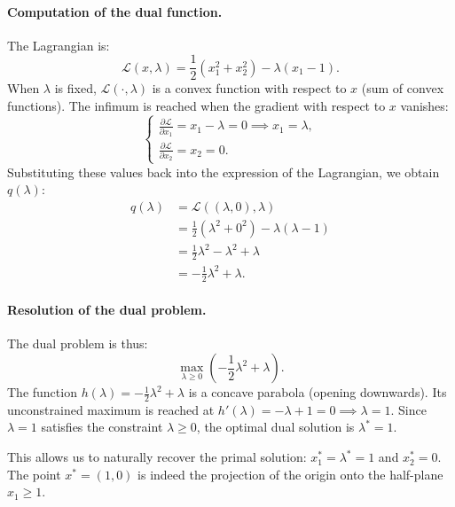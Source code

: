 \paragraph{Computation of the dual function.}
The Lagrangian is:
\begin{equation}
    \mathcal{L}(x, \lambda) = \frac{1}{2}(x_1^2 + x_2^2) - \lambda(x_1 - 1).
\end{equation}
When $\lambda$ is fixed, $\mathcal{L}(\cdot, \lambda)$ is a convex function with respect to $x$ (sum of convex functions). The infimum is reached when the gradient with respect to $x$ vanishes:
\begin{equation}
    \begin{cases}
        \frac{\partial \mathcal{L}}{\partial x_1} = x_1 - \lambda = 0 \implies x_1 = \lambda, \\
        \frac{\partial \mathcal{L}}{\partial x_2} = x_2 = 0.
    \end{cases}
\end{equation}
Substituting these values back into the expression of the Lagrangian, we obtain $q(\lambda)$:
\begin{align}
    q(\lambda) &= \mathcal{L}((\lambda, 0), \lambda) \\
    &= \frac{1}{2}(\lambda^2 + 0^2) - \lambda(\lambda - 1) \\
    &= \frac{1}{2}\lambda^2 - \lambda^2 + \lambda \\
    &= -\frac{1}{2}\lambda^2 + \lambda.
\end{align}

\paragraph{Resolution of the dual problem.}
The dual problem is thus:
\begin{equation}
    \max_{\lambda \geq 0} \left( -\frac{1}{2}\lambda^2 + \lambda \right).
\end{equation}
The function $h(\lambda) = -\frac{1}{2}\lambda^2 + \lambda$ is a concave parabola (opening downwards). Its unconstrained maximum is reached at $h'(\lambda) = -\lambda + 1 = 0 \implies \lambda = 1$.
Since $\lambda = 1$ satisfies the constraint $\lambda \geq 0$, the optimal dual solution is $\lambda^* = 1$.

This allows us to naturally recover the primal solution: $x^*_1 = \lambda^* = 1$ and $x^*_2 = 0$.
The point $x^* = (1, 0)$ is indeed the projection of the origin onto the half-plane $x_1 \geq 1$.

